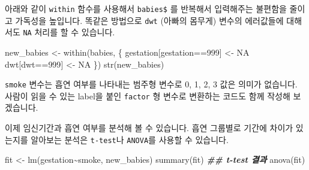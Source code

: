 \documentclass[
]{book}
\newenvironment{Shaded}{\begin{snugshade}}{\end{snugshade}}
\newcommand{\ConstantTok}[1]{\textcolor[rgb]{0.00,0.00,0.00}{#1}}
\newcommand{\DecValTok}[1]{\textcolor[rgb]{0.00,0.00,0.81}{#1}}
\newcommand{\DocumentationTok}[1]{\textcolor[rgb]{0.56,0.35,0.01}{\textbf{\textit{#1}}}}
\newcommand{\FunctionTok}[1]{\textcolor[rgb]{0.00,0.00,0.00}{#1}}
\newcommand{\NormalTok}[1]{#1}
\newcommand{\OtherTok}[1]{\textcolor[rgb]{0.56,0.35,0.01}{#1}}
\newcommand{\SpecialCharTok}[1]{\textcolor[rgb]{0.00,0.00,0.00}{#1}}
\newcommand{\StringTok}[1]{\textcolor[rgb]{0.31,0.60,0.02}{#1}}
\begin{document}
아래와 같이 \texttt{within} 함수를 사용해서 \texttt{babies\$} 를 반복해서 입력해주는 불편함을 줄이고 가독성을 높입니다. 똑같은 방법으로 \texttt{dwt} (아빠의 몸무게) 변수의 에러값들에 대해서도 \texttt{NA} 처리를 할 수 있습니다.

\begin{Shaded}
\begin{Highlighting}[]
\NormalTok{new\_babies }\OtherTok{\textless{}{-}} \FunctionTok{within}\NormalTok{(babies, \{}
\NormalTok{  gestation[gestation}\SpecialCharTok{==}\DecValTok{999}\NormalTok{] }\OtherTok{\textless{}{-}} \ConstantTok{NA}
\NormalTok{  dwt[dwt}\SpecialCharTok{==}\DecValTok{999}\NormalTok{] }\OtherTok{\textless{}{-}} \ConstantTok{NA}
\NormalTok{\})}
\FunctionTok{str}\NormalTok{(new\_babies)}
\end{Highlighting}
\end{Shaded}

\texttt{smoke} 변수는 흡연 여부를 나타내는 범주형 변수로 0, 1, 2, 3 값은 의미가 없습니다. 사람이 읽을 수 있는 label을 붙인 \texttt{factor} 형 변수로 변환하는 코드도 함께 작성해 보겠습니다.

\begin{Shaded}
\end{Shaded}

이제 임신기간과 흡연 여부를 분석해 볼 수 있습니다. 흡연 그룹별로 기간에 차이가 있는지를 알아보는 분석은 \texttt{t-test}나 \texttt{ANOVA}를 사용할 수 있습니다.

\begin{Shaded}
\begin{Highlighting}[]
\NormalTok{fit }\OtherTok{\textless{}{-}} \FunctionTok{lm}\NormalTok{(gestation}\SpecialCharTok{\textasciitilde{}}\NormalTok{smoke, new\_babies)}
\FunctionTok{summary}\NormalTok{(fit) }\DocumentationTok{\#\# t{-}test 결과 }
\FunctionTok{anova}\NormalTok{(fit)}
\end{Highlighting}
\end{Shaded}
\end{document}
